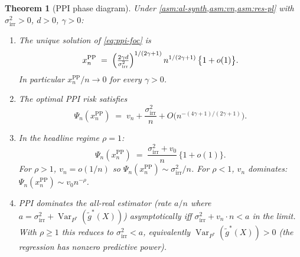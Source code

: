 \documentclass[11pt]{article}
\theoremstyle{plain}
\newtheorem{theorem}{Theorem}[section]
\theoremstyle{definition}
\theoremstyle{remark}
\newcommand{\Var}{\operatorname{Var}}
\begin{document}
\begin{theorem}[PPI phase diagram]\label{thm:ppi-phase}
Under \cref{asm:al-synth,asm:vn,asm:res-pl} with $\sigma_{\mathrm{irr}}^2>0$, $d>0$, $\gamma>0$:
\begin{enumerate}[label=\rm(\roman*),leftmargin=*]
\item The unique solution of \cref{eq:ppi-foc} is
\begin{equation}\label{eq:xn-ppi}
x_n^{\mathrm{PP}}\;=\;\Bigl(\tfrac{2\gamma d}{\sigma_{\mathrm{irr}}^2}\Bigr)^{1/(2\gamma+1)}\,n^{1/(2\gamma+1)}\,\bigl\{1+o(1)\bigr\}.
\end{equation}
In particular $x_n^{\mathrm{PP}}/n\to0$ for every $\gamma>0$.
\item The optimal PPI risk satisfies
\begin{equation}\label{eq:Psi-opt}
\Psi_n(x_n^{\mathrm{PP}})\;=\;v_n+\frac{\sigma_{\mathrm{irr}}^2}{n}+O\bigl(n^{-(4\gamma+1)/(2\gamma+1)}\bigr).
\end{equation}
\item In the headline regime $\rho=1$:
\begin{equation*}
\Psi_n(x_n^{\mathrm{PP}})\;=\;\frac{\sigma_{\mathrm{irr}}^2+v_0}{n}\,\bigl\{1+o(1)\bigr\}.
\end{equation*}
For $\rho>1$, $v_n=o(1/n)$ so $\Psi_n(x_n^{\mathrm{PP}})\sim\sigma_{\mathrm{irr}}^2/n$. For $\rho<1$, $v_n$ dominates: $\Psi_n(x_n^{\mathrm{PP}})\sim v_0 n^{-\rho}$.
\item PPI dominates the all-real estimator (rate $a/n$ where $a=\sigma_{\mathrm{irr}}^2+\Var_{P^*}(\tilde g^*(X))$) asymptotically iff $\sigma_{\mathrm{irr}}^2+v_n\cdot n<a$ in the limit. With $\rho\ge1$ this reduces to $\sigma_{\mathrm{irr}}^2<a$, equivalently $\Var_{P^*}(\tilde g^*(X))>0$ (the regression has nonzero predictive power).
\end{enumerate}
\end{theorem}
\end{document}
